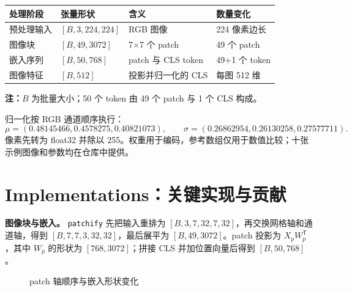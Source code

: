 \documentclass[a4paper,12pt]{article}
\begin{document}
\begin{center}
\small
\begin{tabular}{llll}
\toprule
处理阶段 & 张量形状 & 含义 & 数量变化 \\
\midrule
预处理输入 & $[B,3,224,224]$ & RGB 图像 & 224 像素边长 \\
图像块 & $[B,49,3072]$ & 7$\times$7 个 patch & 49 个 patch \\
嵌入序列 & $[B,50,768]$ & patch 与 CLS token & 49+1 个 token \\
图像特征 & $[B,512]$ & 投影并归一化的 CLS & 每图 512 维 \\
\bottomrule
\end{tabular}
\end{center}
\vspace{-0.15cm}
{\footnotesize\noindent\textbf{注：}$B$ 为批量大小；50 个 token 由 49 个 patch 与 1 个 CLS 构成。\par}

归一化按 RGB 通道顺序执行：
\[
\mu=(0.48145466,0.4578275,0.40821073),\qquad
\sigma=(0.26862954,0.26130258,0.27577711).
\]
像素先转为 float32 并除以 255。权重用于编码，参考数组仅用于数值比较；十张示例图像和参数均在仓库中提供。

\newpage
\section{Implementations：关键实现与贡献}
\textbf{图像块与嵌入。} \texttt{patchify} 先把输入重排为 $[B,3,7,32,7,32]$，再交换网格轴和通道轴，得到 $[B,7,7,3,32,32]$，最后展平为 $[B,49,3072]$。patch 投影为 $X_pW_p^\mathsf{T}$，其中 $W_p$ 的形状为 $[768,3072]$；拼接 CLS 并加位置向量后得到 $[B,50,768]$。

\begin{figure}[H]
\centering
{}
\caption{patch 轴顺序与嵌入形状变化}
\end{figure}
\end{document}
